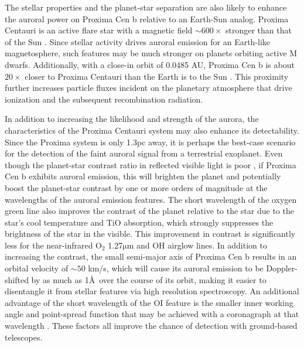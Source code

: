 \documentclass{emulateapj}
\begin{document}
The stellar properties and the planet-star separation are also likely to enhance the auroral power on Proxima Cen b relative to an Earth-Sun analog. Proxima Centauri is an active flare star with a magnetic field ${\sim} 600\times$ stronger than that of the Sun \citep{Reiners2008,Davenport2016}. Since stellar activity drives auroral emission for an Earth-like magnetosphere, such features may be much stronger on planets orbiting active M dwarfs. Additionally, with a close-in orbit of 0.0485 AU, Proxima Cen b is about $20\times$ closer to Proxima Centauri than the Earth is to the Sun \citep{Anglada-Escude2016}. This proximity further increases particle fluxes incident on the planetary atmosphere that drive ionization and the subsequent recombination radiation.

In addition to increasing the likelihood and strength of the aurora, the characteristics of the Proxima Centauri system may also enhance its detectability. Since the Proxima system is only 1.3pc away, it is perhaps the best-case scenario for the detection of the faint auroral signal from a terrestrial exoplanet. Even though the planet-star contrast ratio in reflected visible light is poor \citep[${\lesssim} 10^{-7}$; see][]{Turbet2016,Kreidberg2016,Meadows2016}, if Proxima Cen b exhibits auroral emission, this will brighten the planet and potentially boost the planet-star contrast by one or more orders of magnitude at the wavelengths of the auroral emission features. The short wavelength of the oxygen green line also improves the contrast of the planet relative to the star due to the star's cool temperature and TiO absorption, which strongly suppresses the brightness of the star in the visible. This improvement in contrast is significantly less for the near-infrared O$_2$ 1.27$\mathrm{\mu}$m and OH airglow lines. In addition to increasing the contrast, the small semi-major axis of Proxima Cen b results in an orbital velocity of ${\sim} 50$ km/s, which will cause its auroral emission to be Doppler-shifted by as much as 1\AA\ over the course of its orbit, making it easier to disentangle it from stellar features via high resolution spectroscopy. An additional advantage of the short wavelength of the OI feature is the smaller inner working angle and point-spread function that may be achieved with a coronagraph at that wavelength \citep{Agol2007}. These factors all improve the chance of detection with ground-based telescopes.
\end{document}
